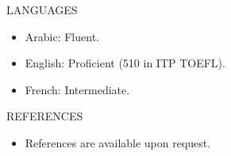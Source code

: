 \documentclass{resume} %
\begin{document}
\begin{rSection}{LANGUAGES} 
\begin{itemize}
    \item 	Arabic: Fluent.
    \item   English: Proficient (510 in ITP TOEFL).
    \item   French: Intermediate.
\end{itemize}
\end{rSection}




\begin{rSection}{REFERENCES} 
\begin{itemize}
    \item 	References are available upon request.
\end{itemize}


\end{rSection}
\end{document}
